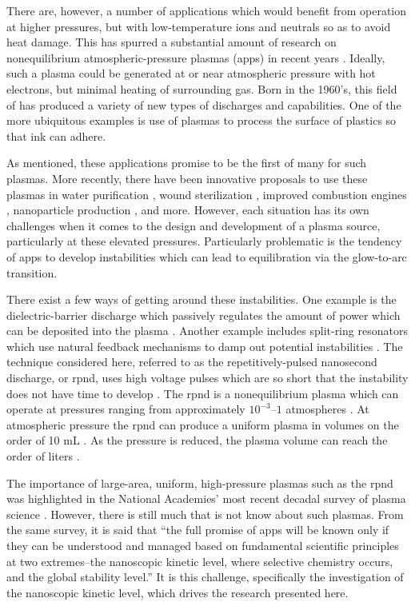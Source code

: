 There are, however, a number of applications which would benefit from operation
at higher pressures, but with low-temperature ions and neutrals so as to avoid
heat damage. This has spurred a substantial amount of research on nonequilibrium
atmospheric-pressure plasmas (\acs{app}s) in recent years \cite{Becker2005,
Starikovskii2009, Nishihara2011, Laroussi2005, Walsh2006, Lu2006}. Ideally, such
a plasma could be generated at or near atmospheric pressure with hot electrons,
but minimal heating of surrounding gas. Born in the 1960's, this field of has
produced a variety of new types of discharges and capabilities. One of the more
ubiquitous examples is use of plasmas to process the surface of plastics so that
ink can adhere. 

As mentioned, these applications promise to be the first of many for such
plasmas. More recently, there have been innovative proposals to use these
plasmas in water purification \cite{Malik2001}, wound sterilization
\cite{Ayan2009}, improved combustion engines \cite{Nishihara2007}, nanoparticle
production \cite{Ostrikov2011}, and more. However, each situation has its own
challenges when it comes to the design and development of a plasma source,
particularly at these elevated pressures. Particularly problematic is the
tendency of \acs{app}s to develop instabilities which can lead to equilibration
via the glow-to-arc transition.

There exist a few ways of getting around these instabilities. One example is the
dielectric-barrier discharge which passively regulates the amount of power which
can be deposited into the plasma \cite{Kogelschatz2003}. Another example
includes split-ring resonators which use natural feedback mechanisms to damp out
potential instabilities \cite{Iza2005}. The technique considered here, referred
to as the repetitively-pulsed nanosecond discharge, or \acs{rpnd}, uses high
voltage pulses which are so short that the instability does not have time to
develop \cite{Adamovich2008}. The \acs{rpnd} is a nonequilibrium plasma which
can operate at pressures ranging from approximately $10^{-3}$--$1$ atmospheres
\cite{Vasilyak1994}. At atmospheric pressure the \acs{rpnd} can produce a
uniform plasma in volumes on the order of 10 mL \cite{Walsh2006}. As the
pressure is reduced, the plasma volume can reach the order of liters
\cite{Starikovskaia1998}.

The importance of large-area, uniform, high-pressure plasmas such as the
\acs{rpnd} was highlighted in the National Academies' most recent decadal survey
of plasma science \cite{NA2007}. However, there is still much that is not know
about such plasmas. From the same survey, it is said that ``the full promise of
\acs{app}s will be known only if they can be understood and managed based on
fundamental scientific principles at two extremes--the nanoscopic kinetic level,
where selective chemistry occurs, and the global stability level.'' It is this
challenge, specifically the investigation of the nanoscopic kinetic level, which
drives the research presented here.

